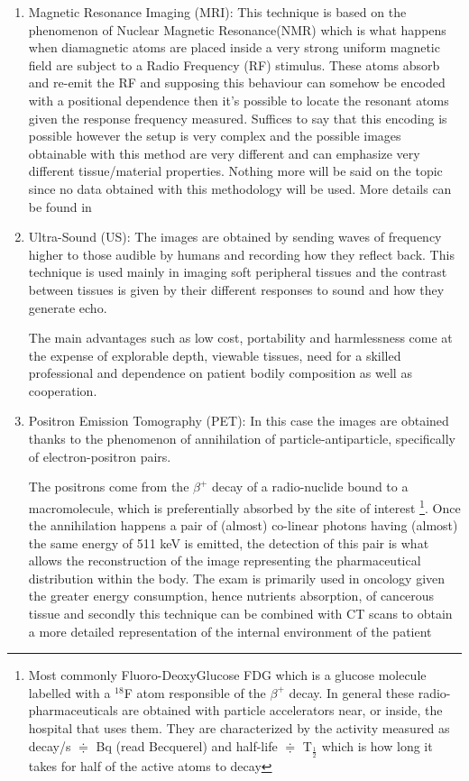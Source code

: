 \begin{enumerate}
\item Magnetic Resonance Imaging (MRI): This technique is based on the phenomenon of Nuclear Magnetic Resonance(NMR) which is what happens when diamagnetic atoms are placed inside a very strong uniform magnetic field are subject to a Radio Frequency (RF) stimulus. These atoms absorb and re-emit the RF and supposing this behaviour can somehow be encoded with a positional dependence then it's possible to locate the resonant atoms given the response frequency measured. Suffices to say that this encoding is possible however the setup is very complex and the possible images obtainable with this method are very different and can emphasize very different tissue/material properties. Nothing more will be said on the topic since no data obtained with this methodology will be used. More details can be found in \cite{MRI}
\item Ultra-Sound (US): The images are obtained by sending waves of frequency higher to those audible by humans and recording how they reflect back. This technique is used mainly in imaging soft peripheral tissues and the contrast between tissues is given by their different responses to sound and how they generate echo. 

The main advantages such as low cost, portability and harmlessness come at the expense of explorable depth, viewable tissues, need for a skilled professional and dependence on patient bodily composition as well as cooperation.

\item Positron Emission Tomography (PET): In this case the images are obtained thanks to the phenomenon of annihilation of particle-antiparticle, specifically of electron-positron pairs.	

The positrons come from the $\beta ^+$ decay of a radio-nuclide bound to a macromolecule, which is preferentially absorbed by the site of interest \footnote{Most commonly Fluoro-DeoxyGlucose FDG which is a glucose molecule labelled with a $^{18}$F atom responsible of the $\beta ^+$ decay. In general these radio-pharmaceuticals are obtained with particle accelerators near, or inside, the hospital that uses them. They are characterized by the activity measured as decay/s $\doteqdot$ Bq (read Becquerel) and half-life $\doteqdot$ T$_{\frac{1}{2}}$ which is how long it takes for half of the active atoms to decay}. Once the annihilation happens a pair of (almost) co-linear photons having (almost) the same energy of 511 keV is emitted, the detection of this pair is what allows the reconstruction of the image representing the pharmaceutical distribution within the body. The exam is primarily used in oncology given the greater energy consumption, hence nutrients absorption, of cancerous tissue and secondly this technique can be combined with CT scans to obtain a more detailed representation of the internal environment of the patient
\end{enumerate}

